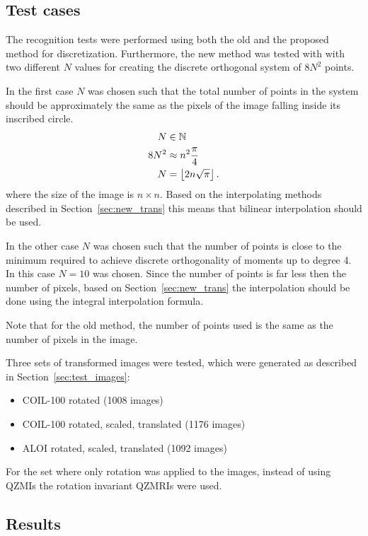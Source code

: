 \subsection{Test cases}
The recognition tests were performed using both the old and the proposed method for discretization. Furthermore, the new method was tested with with two different $N$ values for creating the discrete orthogonal system of $8N^2$ points.

In the first case $N$ was chosen such that the total number of points in the system should be approximately the same as the pixels of the image falling inside its inscribed circle.
\begin{gather*}
    \begin{split}
    N &\in \mathbb{N} \\
    8N^2 &\approx n^2\frac{\pi}{4} \\
    N &= \left\lfloor 2n\sqrt{\pi}\right\rfloor.
    \end{split}
\end{gather*}
where the size of the image is $n \times n$. Based on the interpolating methods described in Section~\ref{sec:new_trans} this means that bilinear interpolation should be used.

In the other case $N$ was chosen such that the number of points is close to the minimum required to achieve discrete orthogonality of moments up to degree 4. In this case $N = 10$ was chosen.
Since the number of points is far less then the number of pixels, based on Section~\ref{sec:new_trans} the interpolation should be done using the integral interpolation formula.

Note that for the old method, the number of points used is the same as the number of pixels in the image.

Three sets of transformed images were tested, which were generated as described in Section~\ref{sec:test_images}:
\begin{itemize}
    \item COIL-100 rotated (1008 images)
    \item COIL-100 rotated, scaled, translated (1176 images)
    \item ALOI rotated, scaled, translated (1092 images)
\end{itemize} 
For the set where only rotation was applied to the images, instead of using QZMIs the rotation invariant QZMRIs were used.

\subsection{Results}

